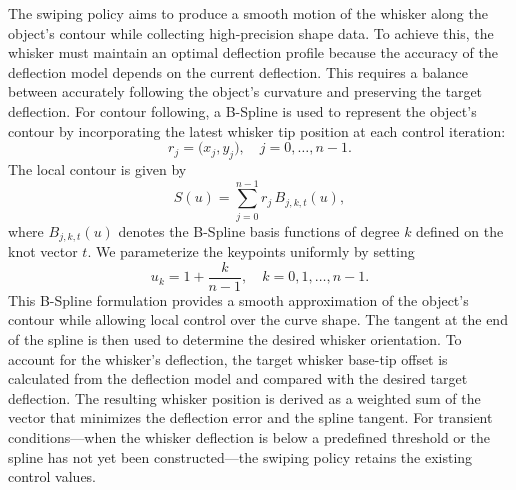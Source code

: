 The swiping policy aims to produce a smooth motion of the whisker along the object's contour while collecting high-precision shape data.
To achieve this, the whisker must maintain an optimal deflection profile because the accuracy of the deflection model depends on the current deflection.
This requires a balance between accurately following the object's curvature and preserving the target deflection.
For contour following, a B-Spline is used to represent the object's contour by incorporating the latest whisker tip position at each control iteration:
\[
    r_j = \bigl(x_j,y_j\bigr), \quad j=0,\dots,n-1.
\]
The local contour is given by
\[
    S(u) = \sum_{j=0}^{n-1} r_j \, B_{j,k,t}(u),
\]
where \(B_{j,k,t}(u)\) denotes the B-Spline basis functions of degree \(k\) defined on the knot vector \(t\).
We parameterize the keypoints uniformly by setting
\[
    u_k = 1 + \frac{k}{n-1}, \quad k=0,1,\dots,n-1.
\]
This B-Spline formulation provides a smooth approximation of the object's contour while allowing local control over the curve shape.
The tangent at the end of the spline is then used to determine the desired whisker orientation.
To account for the whisker's deflection, the target whisker base-tip offset is calculated from the deflection model and compared with the desired target deflection.
The resulting whisker position is derived as a weighted sum of the vector that minimizes the deflection error and the spline tangent.
For transient conditions—when the whisker deflection is below a predefined threshold or the spline has not yet been constructed—the swiping policy retains the existing control values.

